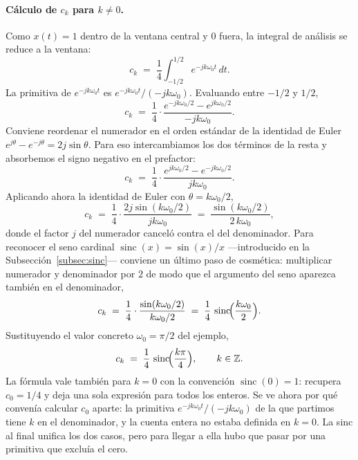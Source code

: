 \documentclass[class=book, crop=false]{standalone}
\begin{document}
\paragraph{Cálculo de $c_k$ para $k \neq 0$.}
Como $x(t) = 1$ dentro de la ventana central y $0$ fuera, la
integral de análisis se reduce a la ventana:
\begin{equation*}
    c_k \;=\; \frac{1}{4}\int_{-1/2}^{1/2} e^{-jk\omega_0 t}\,dt.
\end{equation*}
La primitiva de $e^{-jk\omega_0 t}$ es
$e^{-jk\omega_0 t}/(-jk\omega_0)$. Evaluando entre $-1/2$ y $1/2$,
\begin{equation*}
    c_k \;=\; \frac{1}{4}\cdot
        \frac{e^{-jk\omega_0/2} - e^{jk\omega_0/2}}{-jk\omega_0}.
\end{equation*}
Conviene reordenar el numerador en el orden estándar de la
identidad de Euler $e^{j\theta} - e^{-j\theta} = 2j\sin\theta$.
Para eso intercambiamos los dos términos de la resta y absorbemos
el signo negativo en el prefactor:
\begin{equation*}
    c_k \;=\; \frac{1}{4}\cdot
        \frac{e^{jk\omega_0/2} - e^{-jk\omega_0/2}}{jk\omega_0}.
\end{equation*}
Aplicando ahora la identidad de Euler con $\theta = k\omega_0/2$,
\begin{equation*}
    c_k \;=\; \frac{1}{4}\cdot
        \frac{2j\sin(k\omega_0/2)}{jk\omega_0}
    \;=\; \frac{\sin(k\omega_0/2)}{2\,k\omega_0},
\end{equation*}
donde el factor $j$ del numerador canceló contra el del
denominador. Para reconocer el seno cardinal
$\operatorname{sinc}(x) = \sin(x)/x$ ---introducido
en la Subsección~\ref{subsec:sinc}--- conviene un último paso de cosmética:
multiplicar numerador y denominador por $2$ de modo que el
argumento del seno aparezca también en el denominador,
\begin{equation*}
    c_k \;=\; \frac{1}{4}\cdot
        \frac{\sin(k\omega_0/2)}{k\omega_0/2}
        \;=\; \frac{1}{4}\,\operatorname{sinc}\!\Bigl(\frac{k\omega_0}{2}\Bigr).
\end{equation*}
Sustituyendo el valor concreto $\omega_0 = \pi/2$ del ejemplo,
\begin{equation}
    c_k \;=\; \frac{1}{4}\,\operatorname{sinc}\!\Bigl(\frac{k\pi}{4}\Bigr),
    \qquad k \in \mathbb{Z}.
    \label{eq:ck_pulso}
\end{equation}
La fórmula vale también para $k=0$ con la convención
$\operatorname{sinc}(0) = 1$: recupera $c_0 = 1/4$ y deja una sola
expresión para todos los enteros. Se ve ahora por qué convenía
calcular $c_0$ aparte: la primitiva $e^{-jk\omega_0 t}/(-jk\omega_0)$
de la que partimos tiene $k$ en el denominador, y la cuenta entera
no estaba definida en $k=0$. La sinc al final unifica los dos casos,
pero para llegar a ella hubo que pasar por una primitiva que excluía
el cero.
\end{document}
